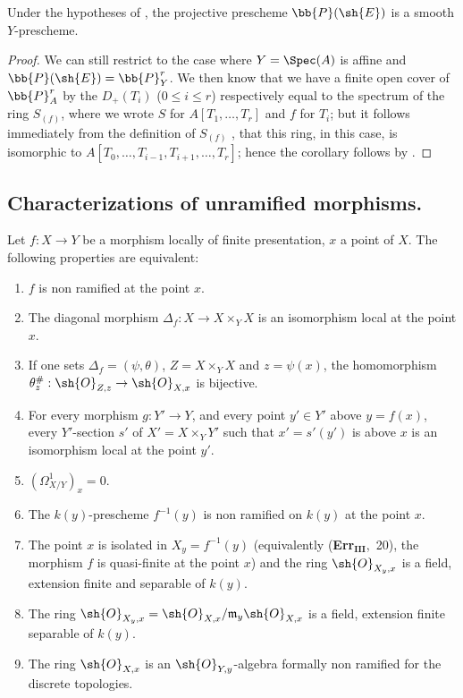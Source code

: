 \begin{corollary}[17.3.9]
\label{IV.17.3.9}
Under the hypotheses of , the projective prescheme $\bb{P}(\sh{E})$  is a smooth $Y$-prescheme.
\end{corollary}

\begin{proof}
We can still restrict to the case where $Y=\Spec(A)$ is affine and $\bb{P}(\sh{E})=\bb{P}_Y^r$.
We then know  that we have a finite open cover of $\bb{P}^r_{A}$ by the $D_+(T_i)$ ($0\leq i\leq r$) respectively equal to the spectrum of the ring $S_{(f)}$, where we wrote $S$ for $A[T_1,\dots,T_r]$ and $f$ for $T_i$;
but it follows immediately from the definition of $S_{(f)}$ , that this ring, in this case, is isomorphic to $A[T_0,\dots,T_{i-1},T_{i+1},\dots,T_r]$;
hence the corollary follows by .
\end{proof}

\subsection{Characterizations of unramified morphisms.}
\label{subsection:IV.17.4}


\begin{theorem}[17.4.1]
\label{IV.17.4.1}
Let $f:X\to Y$ be a morphism locally of finite presentation, $x$ a point of $X$.
The following properties are equivalent:
\begin{enumerate}[label=(\alph*)]
  \item $f$ is non ramified at the point $x$.
  \item The diagonal morphism $\Delta_f:X\to X\times_Y X$ is an isomorphism local at the point $x$.
  \item[b')] If one sets $\Delta_f=(\psi,\theta)$, $Z=X\times_Y X$ and $z=\psi(x)$, the homomorphism $\theta_z^\#:\sh{O}_{Z,z}\to\sh{O}_{X,x}$ is bijective.
  \item[b'')] For every morphism $g:Y'\to Y$, and every point $y'\in Y'$ above $y=f(x)$, every $Y'$-section $s'$ of $X'=X\times_Y Y'$ such that $x'=s'(y')$ is above $x$ is an isomorphism local at the point $y'$.
  \item $(\Omega^1_{X/Y})_x=0$.
  \item The $k(y)$-prescheme $f^{-1}(y)$ is non ramified on $k(y)$ at the point $x$.
  \item[d')] The point $x$ is isolated in $X_y=f^{-1}(y)$ (equivalently (\textbf{Err}$_\textbf{III}$,~20), the morphism $f$ is quasi-finite at the point $x$) and the ring $\sh{O}_{X_y,x}$ is a field, extension finite and separable of $k(y)$.
  \item[d'')] The ring $\sh{O}_{X_y,x}=\sh{O}_{X,x}/\mathfrak{m}_y\sh{O}_{X,x}$ is a field, extension finite separable of $k(y)$.
  \item The ring $\sh{O}_{X,x}$ is an $\sh{O}_{Y,y}$-algebra formally non ramified for the discrete topologies.
\end{enumerate}
\end{theorem}

